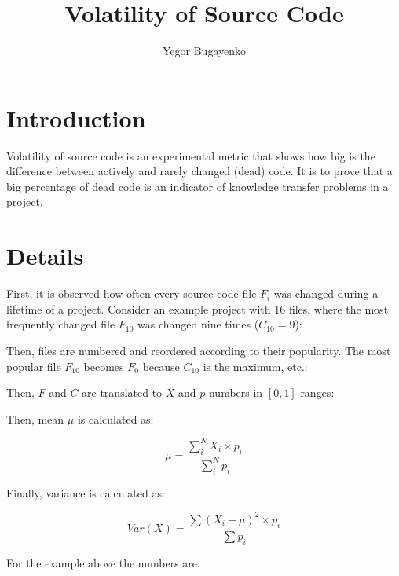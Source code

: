 \documentclass[12pt]{article}
\begin{document}
	\setlength{\parindent}{0pt}
	\setlength{\parskip}{1em}

\title{Volatility of Source Code}
\author{Yegor Bugayenko}
\maketitle

\section{Introduction}

    Volatility of source code is an experimental metric that
    shows how big is the difference between actively and rarely changed (dead)
    code. It is to prove that a big percentage of dead code is
    an indicator of knowledge transfer problems in a project.

\section{Details}

    First, it is observed how often every source code file $F_i$ was changed
    during a lifetime of a project. Consider an example project with 16 files,
    where the most frequently changed file $F_{10}$ was changed nine times
    ($C_{10} = 9$):

    \immediate{}
    

    Then, files are numbered and reordered according to their popularity.
    The most popular file $F_{10}$ becomes $F_0$ because $C_{10}$ is
    the maximum, etc.:

    \immediate{}
    

    Then, $F$ and $C$ are translated to $X$ and $p$ numbers in $[0, 1]$ ranges:

    \immediate{}
    

    Then, mean $\mu$ is calculated as:

        $$\mu = \frac{\displaystyle\sum\limits^N_i {X_i \times p_i}}{\displaystyle\sum\limits^N_i p_i}$$

    Finally, variance is calculated as:

        $$Var(X) = \frac{\displaystyle\sum\limits {(X_i - \mu)^2 \times p_i}}{\displaystyle\sum\limits p_i}$$

    For the example above the numbers are:
\end{document}
